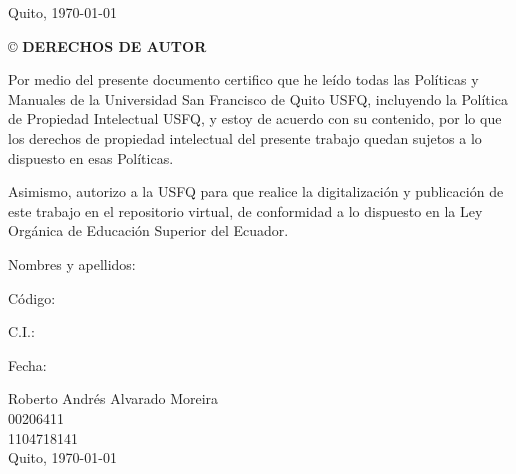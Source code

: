 \documentclass[a4paper, 12pt]{report}
\begin{document}
\vfill 
\begin{center}
\normalsize Quito, \today
\end{center}

\newpage
\begin{center}
\begin{large}
\copyright \hspace{0.1cm} \textbf{DERECHOS DE AUTOR}
\end{large}
\end{center}

\normalsize Por medio del presente documento certifico que he leído todas las Políticas y Manuales de la Universidad San Francisco de Quito USFQ, incluyendo la Política de Propiedad Intelectual USFQ, y estoy de acuerdo con su contenido, por lo que los derechos de propiedad intelectual del presente trabajo quedan sujetos a lo dispuesto en esas Políticas. 

\normalsize Asimismo, autorizo a la USFQ para que realice la digitalización y publicación de este trabajo en el repositorio virtual, de conformidad a lo dispuesto en la Ley Orgánica de Educación Superior del Ecuador.



\vspace{5cm}
\noindent
\begin{minipage}{0.3\linewidth}   

  \small Nombres y apellidos:
  \vspace{0.7cm}

  \small Código:
  \vspace{0.7cm}

  \small C.I.:
  \vspace{0.7cm}

  \small Fecha:
  \vspace{0.7cm}

\end{minipage}
\begin{minipage}{0.7\linewidth}
  \small Roberto Andrés Alvarado Moreira
  \vspace{0.7cm}\\
  \small 00206411
  \vspace{0.7cm}\\
  \small 1104718141
  \vspace{0.7cm}\\
  \small Quito, \today
  \vspace{0.7cm}

\end{minipage}
\end{document}

